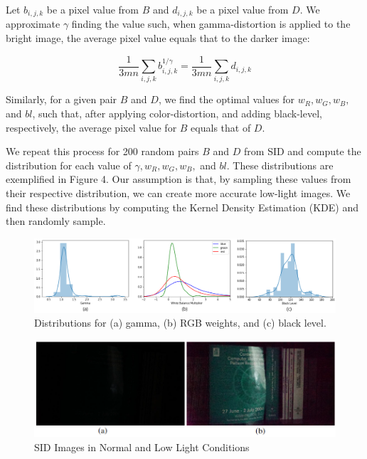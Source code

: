 \documentclass{article}
\begin{document}
Let \(b_{i,j,k}\) be a pixel value from \(B\) and \(d_{i,j,k}\) be a pixel value from \(D\). We approximate \(\gamma\) finding the value such, when gamma-distortion is applied to the bright image, the average pixel value equals that to the darker image:

\[  \frac{1}{3mn}\sum_{i,j,k}b_{i,j,k}^
{1/\gamma} = \frac{1}{3mn}\sum_{i,j,k}d_{i,j,k}\] 

Similarly, for a given pair \(B\) and \(D\), we find the optimal values for \(w_{R}, w_{G}, w_{B},\) and \(bl\), such that, after applying color-distortion, and adding black-level, respectively, the average pixel value for \(B\) equals that of \(D\). \newline

We repeat this process for 200 random pairs \(B\) and \(D\) from SID and compute the distribution for each value of \(\gamma, w_{R}, w_{G}, w_{B},\) and \(bl\). These distributions are exemplified in Figure 4. Our assumption is that, by sampling these values from their respective distribution, we can create more accurate low-light images. We find these distributions by computing
the Kernel Density Estimation (KDE) and then randomly sample. 

\begin{figure}[ht]
  \centering
  \includegraphics[scale=0.4]{Distributions}
  \caption{Distributions for (a) gamma, (b) RGB weights, and (c) black level.}
  \label{fig:train2}
\end{figure}


\begin{figure}[ht]
  \centering
  \includegraphics[scale=0.5]{low_light_normal_light}
  \caption{ SID Images in Normal and Low Light Conditions}
  \label{fig:train4}
\end{figure}
\end{document}
